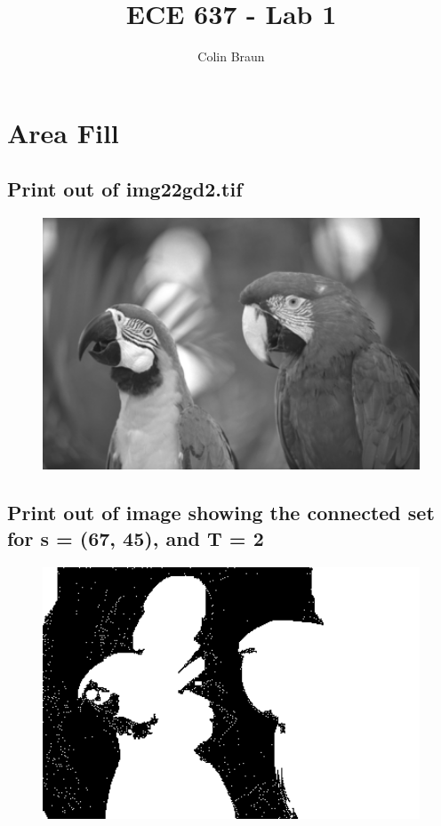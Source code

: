 \documentclass{article}
\title{ECE 637 - Lab 1}
\author{Colin Braun}
\begin{document}
\maketitle

\section{Area Fill}
\subsection{Print out of img22gd2.tif}
\begin{figure}[H]
    \centering
    \includegraphics[width=1\textwidth]{../img22gd2.png}
    \begin{center}
    \end{center}
\end{figure}
\subsection{Print out of image showing the connected set for s = (67, 45), and T = 2}
\begin{figure}[H]
    \centering
    \includegraphics[width=1\textwidth]{../connected-set-2t.png}
    \begin{center}
    \end{center}
\end{figure}
\end{document}
